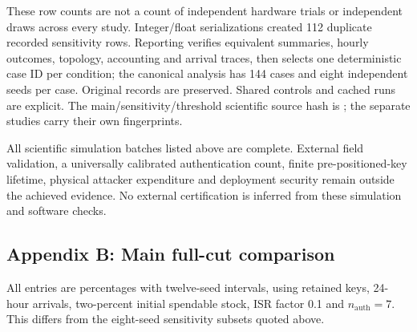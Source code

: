 These row counts are not a count of independent hardware trials or independent draws across every study. Integer/float serializations created 112 duplicate recorded sensitivity rows. Reporting verifies equivalent summaries, hourly outcomes, topology, accounting and arrival traces, then selects one deterministic case ID per condition; the canonical analysis has 144 cases and eight independent seeds per case. Original records are preserved. Shared controls and cached runs are explicit. The main/sensitivity/threshold scientific source hash is ; the separate studies carry their own fingerprints.

All scientific simulation batches listed above are complete. External field validation, a universally calibrated authentication count, finite pre-positioned-key lifetime, physical attacker expenditure and deployment security remain outside the achieved evidence. No external certification is inferred from these simulation and software checks.

\subsection{Appendix B: Main full-cut comparison}\label{appendix-b-main-full-cut-comparison}

All entries are percentages with twelve-seed intervals, using retained keys, 24-hour arrivals, two-percent initial spendable stock, ISR factor 0.1 and \(n_{\mathrm{auth}}=7\). This differs from the eight-seed sensitivity subsets quoted above.


